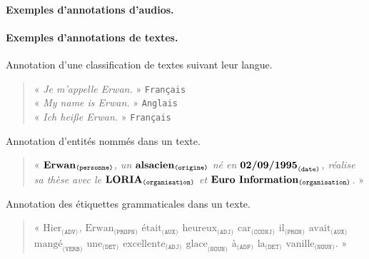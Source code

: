 			\paragraph{Exemples d'annotations d'audios.}
			
			\paragraph{Exemples d'annotations de textes.}
				
				\begin{leftBarExamples}
					Annotation d'une classification de textes suivant leur langue.
					\begin{quote}
						« \textit{
							Je m'appelle Erwan.
						} » \texttt{Français} \\
						« \textit{
							My name is Erwan.
						} » \texttt{Anglais} \\
						« \textit{
							Ich hei{\ss}e Erwan.
						} » \texttt{Français}
					\end{quote}
				\end{leftBarExamples}
				
				\begin{leftBarExamples}
					Annotation d'entités nommés dans un texte.
					\begin{quote}
						« \textit{
							$\textbf{\text{Erwan}}_{\texttt{(personne)}}$, un $\textbf{\text{alsacien}}_{\texttt{(origine)}}$ né en $\textbf{\text{02/09/1995}}_{\texttt{(date)}}$, réalise sa thèse avec le $\textbf{\text{LORIA}}_{\texttt{(organisation)}}$ et $\textbf{\text{Euro Information}}_{\texttt{(organisation)}}$.
						} »
					\end{quote}
				\end{leftBarExamples}
				
				\begin{leftBarExamples}
					Annotation des étiquettes grammaticales dans un texte.
					\begin{quote}
						« \textit{
							$\text{Hier}_{\texttt{(ADV)}}$,
							$\text{Erwan}_{\texttt{(PROPN)}}$
							$\text{était}_{\texttt{(AUX)}}$
							$\text{heureux}_{\texttt{(ADJ)}}$
							$\text{car}_{\texttt{(CCONJ)}}$
							$\text{il}_{\texttt{(PRON)}}$
							$\text{avait}_{\texttt{(AUX)}}$
							$\text{mangé}_{\texttt{(VERB)}}$
							$\text{une}_{\texttt{(DET)}}$
							$\text{excellente}_{\texttt{(ADJ)}}$
							$\text{glace}_{\texttt{(NOUN)}}$
							$\text{à}_{\texttt{(ADP)}}$
							$\text{la}_{\texttt{(DET)}}$
							$\text{vanille}_{\texttt{(NOUN)}}$.
						} »
					\end{quote}
				\end{leftBarExamples}
			
